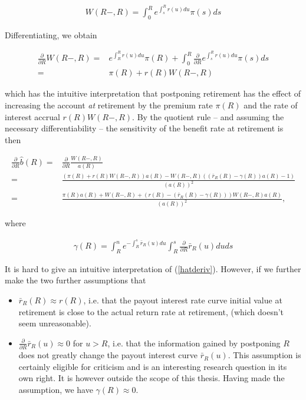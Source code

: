 \documentclass{article}
\newcommand{\1}[1]{\mathbbm{1}_{\left\lbrace #1 \right\rbrace}}
\theoremstyle{break}
\theoremstyle{remark}
\numberwithin{equation}{section}
\begin{document}
\begin{align} \label{ReserveAtRetirement}
	W(R-,R) = \int_0^R e^{\int_s^R r(u) du} \pi(s) ds
\end{align}

Differentiating, we obtain

\begin{align*}
	\frac{\partial}{\partial R} W(R-,R) =& e^{\int_R^R r(u) du} \pi(R) + \int_0^R \frac{\partial}{\partial R} e^{\int_s^R r(u) du} \pi(s) ds \\
	=& \pi(R) + r(R) W(R-,R)
\end{align*}

which has the intuitive interpretation that postponing retirement has the effect of increasing the account \textit{at} retirement by the premium rate $\pi(R)$ and the rate of interest accrual $r(R) W(R-,R)$. By the quotient rule -- and assuming the necessary differentiability -- the sensitivity of the benefit rate at retirement is then

\begin{align} \label{hatderiv}
	\frac{\partial}{\partial R} \hat{b}(R) =& \frac{\partial}{\partial R} \frac{W(R-,R)}{a(R)} \nonumber \\
	=& \frac{\left( \pi(R) + r(R) W(R-,R) \right) a(R) - W(R-,R) \left( \left( \bar{r}_R(R) - \gamma(R) \right) a(R) - 1 \right)}{\left( a(R) \right)^2} \nonumber \\
	=& \frac{\pi(R) a(R)  + W(R-,R) + \left( r(R) - \left( \bar{r}_R(R) - \gamma(R) \right) \right) W(R-,R) a(R)}{\left( a(R) \right)^2},
\end{align}

where

\begin{align*}
	\gamma(R) = \int_R^n e^{-\int_R^s \bar{r}_R(u) du} \int_R^s 	\frac{\partial}{\partial R} \bar{r}_R(u) du ds
\end{align*}

It is hard to give an intuitive interpretation of (\ref{hatderiv}). However, if we further make the two further assumptions that

\begin{itemize}
	\item $\bar{r}_R (R) \approx r (R)$, i.e. that the payout interest rate curve initial value at retirement is close to the actual return rate at retirement, (which doesn't seem unreasonable).
	\item $\frac{\partial}{\partial R} \bar{r}_R(u) \approx 0$ for $u > R$, i.e. that the information gained by postponing $R$ does not greatly change the payout interest curve $\bar{r}_R(u)$. This assumption is certainly eligible for criticism and is an interesting research question in its own right. It is however outside the scope of this thesis. Having made the assumption, we have $\gamma(R) \approx 0$.
\end{itemize}
\end{document}
